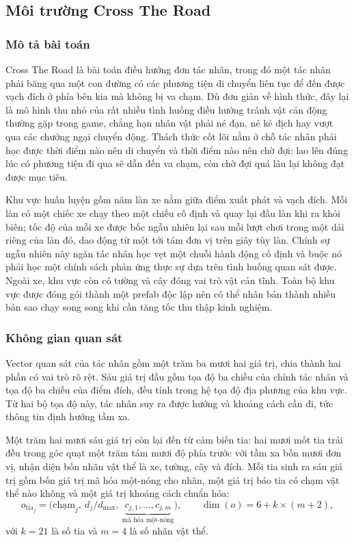 \subsection{Môi trường Cross The Road}
\label{sub:env-crossroad}

\subsubsection{Mô tả bài toán}
\indent Cross The Road là bài toán điều hướng đơn tác nhân, trong đó một tác nhân phải
băng qua một con đường có các phương tiện di chuyển liên tục để đến được vạch đích ở
phía bên kia mà không bị va chạm. Dù đơn giản về hình thức, đây lại là mô hình thu nhỏ
của rất nhiều tình huống điều hướng tránh vật cản động thường gặp trong game, chẳng hạn
nhân vật phải né đạn, né kẻ địch hay vượt qua các chướng ngại chuyển động. Thách thức
cốt lõi nằm ở chỗ tác nhân phải học được thời điểm nào nên di chuyển và thời điểm nào
nên chờ đợi: lao lên đúng lúc có phương tiện đi qua sẽ dẫn đến va chạm, còn chờ đợi quá
lâu lại không đạt được mục tiêu.

\indent Khu vực huấn luyện gồm năm làn xe nằm giữa điểm xuất phát và vạch đích. Mỗi làn
có một chiếc xe chạy theo một chiều cố định và quay lại đầu làn khi ra khỏi biên; tốc
độ của mỗi xe được bốc ngẫu nhiên lại sau mỗi lượt chơi trong một dải riêng của làn đó,
dao động từ một tới tám đơn vị trên giây tùy làn. Chính sự ngẫu nhiên này ngăn tác nhân
học vẹt một chuỗi hành động cố định và buộc nó phải học một chính sách phản ứng thực sự
dựa trên tình huống quan sát được. Ngoài xe, khu vực còn có tường và cây đóng vai trò
vật cản tĩnh. Toàn bộ khu vực được đóng gói thành một prefab độc lập nên có thể nhân
bản thành nhiều bản sao chạy song song khi cần tăng tốc thu thập kinh nghiệm.

\subsubsection{Không gian quan sát}
\label{sub:cross-obs}
\indent Vector quan sát của tác nhân gồm một trăm ba mươi hai giá trị, chia thành hai
phần có vai trò rõ rệt. Sáu giá trị đầu gồm tọa độ ba chiều của chính tác
nhân và tọa độ ba chiều của điểm đích, đều tính trong hệ tọa độ địa phương của khu vực.
Từ hai bộ tọa độ này, tác nhân suy ra được hướng và khoảng cách cần đi, tức thông tin
định hướng tầm xa.

\indent Một trăm hai mươi sáu giá trị còn lại đến từ cảm biến tia: hai mươi mốt
tia trải đều trong góc quạt một trăm tám mươi độ phía trước với tầm xa bốn mươi đơn vị,
nhận diện bốn nhãn vật thể là xe, tường, cây và đích. Mỗi tia sinh ra sáu giá trị gồm
bốn giá trị mã hóa một-nóng cho nhãn, một giá trị báo tia có chạm vật thể nào không và
một giá trị khoảng cách chuẩn hóa:
\begin{equation}
o_{\text{tia}_j} = \bigl(\text{chạm}_j,\ d_j / d_{\max},\
\underbrace{c_{j,1}, \dots, c_{j,m}}_{\text{mã hóa một-nóng}}\bigr),
\qquad
\dim(o) = 6 + k \times (m + 2),
\end{equation}
với $k = 21$ là số tia và $m = 4$ là số nhãn vật thể.

